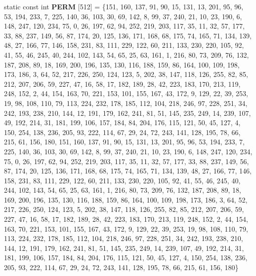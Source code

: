 \begin{DoxyCompactItemize}
\item 
\mbox{\label{classflounder_1_1noisesimplex_ad890db43bf69f4145671a3ab6e521c40}} 
static const int {\bfseries P\+E\+RM} \mbox{[}512\mbox{]} = \{151, 160, 137, 91, 90, 15, 131, 13, 201, 95, 96, 53, 194, 233, 7, 225, 140, 36, 103, 30, 69, 142, 8, 99, 37, 240, 21, 10, 23, 190, 6, 148, 247, 120, 234, 75, 0, 26, 197, 62, 94, 252, 219, 203, 117, 35, 11, 32, 57, 177, 33, 88, 237, 149, 56, 87, 174, 20, 125, 136, 171, 168, 68, 175, 74, 165, 71, 134, 139, 48, 27, 166, 77, 146, 158, 231, 83, 111, 229, 122, 60, 211, 133, 230, 220, 105, 92, 41, 55, 46, 245, 40, 244, 102, 143, 54, 65, 25, 63, 161, 1, 216, 80, 73, 209, 76, 132, 187, 208, 89, 18, 169, 200, 196, 135, 130, 116, 188, 159, 86, 164, 100, 109, 198, 173, 186, 3, 64, 52, 217, 226, 250, 124, 123, 5, 202, 38, 147, 118, 126, 255, 82, 85, 212, 207, 206, 59, 227, 47, 16, 58, 17, 182, 189, 28, 42, 223, 183, 170, 213, 119, 248, 152, 2, 44, 154, 163, 70, 221, 153, 101, 155, 167, 43, 172, 9, 129, 22, 39, 253, 19, 98, 108, 110, 79, 113, 224, 232, 178, 185, 112, 104, 218, 246, 97, 228, 251, 34, 242, 193, 238, 210, 144, 12, 191, 179, 162, 241, 81, 51, 145, 235, 249, 14, 239, 107, 49, 192, 214, 31, 181, 199, 106, 157, 184, 84, 204, 176, 115, 121, 50, 45, 127, 4, 150, 254, 138, 236, 205, 93, 222, 114, 67, 29, 24, 72, 243, 141, 128, 195, 78, 66, 215, 61, 156, 180, 151, 160, 137, 91, 90, 15, 131, 13, 201, 95, 96, 53, 194, 233, 7, 225, 140, 36, 103, 30, 69, 142, 8, 99, 37, 240, 21, 10, 23, 190, 6, 148, 247, 120, 234, 75, 0, 26, 197, 62, 94, 252, 219, 203, 117, 35, 11, 32, 57, 177, 33, 88, 237, 149, 56, 87, 174, 20, 125, 136, 171, 168, 68, 175, 74, 165, 71, 134, 139, 48, 27, 166, 77, 146, 158, 231, 83, 111, 229, 122, 60, 211, 133, 230, 220, 105, 92, 41, 55, 46, 245, 40, 244, 102, 143, 54, 65, 25, 63, 161, 1, 216, 80, 73, 209, 76, 132, 187, 208, 89, 18, 169, 200, 196, 135, 130, 116, 188, 159, 86, 164, 100, 109, 198, 173, 186, 3, 64, 52, 217, 226, 250, 124, 123, 5, 202, 38, 147, 118, 126, 255, 82, 85, 212, 207, 206, 59, 227, 47, 16, 58, 17, 182, 189, 28, 42, 223, 183, 170, 213, 119, 248, 152, 2, 44, 154, 163, 70, 221, 153, 101, 155, 167, 43, 172, 9, 129, 22, 39, 253, 19, 98, 108, 110, 79, 113, 224, 232, 178, 185, 112, 104, 218, 246, 97, 228, 251, 34, 242, 193, 238, 210, 144, 12, 191, 179, 162, 241, 81, 51, 145, 235, 249, 14, 239, 107, 49, 192, 214, 31, 181, 199, 106, 157, 184, 84, 204, 176, 115, 121, 50, 45, 127, 4, 150, 254, 138, 236, 205, 93, 222, 114, 67, 29, 24, 72, 243, 141, 128, 195, 78, 66, 215, 61, 156, 180\}

\end{DoxyCompactItemize}
